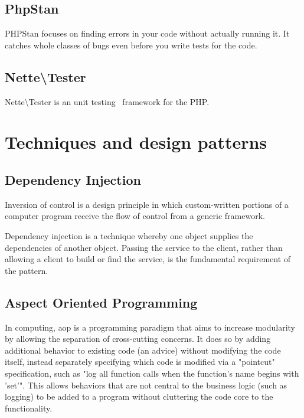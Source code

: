\subsection{PhpStan} \label{sec:theory:phpstan}

PHPStan focuses on finding errors in your code without actually running it. It catches whole classes of bugs even before you write tests for the code.~\cite{github:phpstan}

\subsection{Nette\textbackslash{}Tester} \label{sec:theory:nette-tester}

Nette\textbackslash{}Tester is an unit testing~\cite{wiki:unit-testing} framework for the PHP.~\cite{tester:docs}

\section{Techniques and design patterns}

\subsection{Dependency Injection} \label{sec:theory:di}

Inversion of control is a design principle in which custom-written portions of a computer program receive the flow of control from a generic framework.

Dependency injection is a technique whereby one object supplies the dependencies of another object. Passing the service to the client, rather than allowing a client to build or find the service, is the fundamental requirement of the pattern.~\cite{fowler:di}

\subsection{Aspect Oriented Programming} \label{sec:theory:aop}

In computing, \gls{aop} is a programming paradigm that aims to increase modularity by allowing the separation of cross-cutting concerns. It does so by adding additional behavior to existing code (an advice) without modifying the code itself, instead separately specifying which code is modified via a "pointcut" specification, such as "log all function calls when the function's name begins with 'set'". This allows behaviors that are not central to the business logic (such as logging) to be added to a program without cluttering the code core to the functionality.~\cite{wiki:aop}

